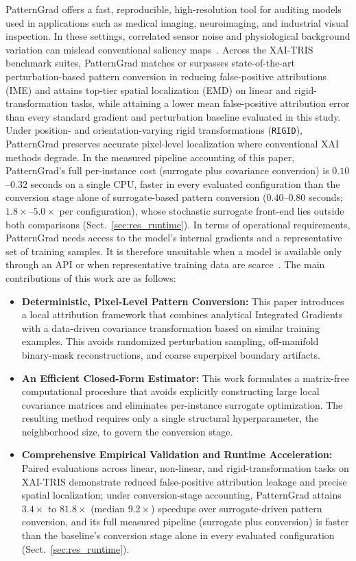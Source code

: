 \documentclass[pdflatex,sn-mathphys-num]{sn-jnl}
\theoremstyle{thmstyleone}
\theoremstyle{thmstyletwo}%
\theoremstyle{thmstylethree}%
\begin{document}
PatternGrad offers a fast, reproducible, high-resolution tool for auditing models used in applications such as medical imaging, neuroimaging, and industrial visual inspection. In these settings, correlated sensor noise and physiological background variation can mislead conventional saliency maps~\cite{haufe2014, clark2024, oliveira2024benchmarking}. Across the XAI-TRIS benchmark suites, PatternGrad matches or surpasses state-of-the-art perturbation-based pattern conversion in reducing false-positive attributions (IME) and attains top-tier spatial localization (EMD) on linear and rigid-transformation tasks, while attaining a lower mean false-positive attribution error than every standard gradient and perturbation baseline evaluated in this study. Under position- and orientation-varying rigid transformations (\texttt{RIGID}), PatternGrad preserves accurate pixel-level localization where conventional XAI methods degrade. In the measured pipeline accounting of this paper, PatternGrad's full per-instance cost (surrogate plus covariance conversion) is $0.10$--$0.32$ seconds on a single CPU, faster in every evaluated configuration than the conversion stage alone of surrogate-based pattern conversion ($0.40$--$0.80$ seconds; $1.8\times$--$5.0\times$ per configuration), whose stochastic surrogate front-end lies outside both comparisons (Sect.~\ref{sec:res_runtime}). In terms of operational requirements, PatternGrad needs access to the model's internal gradients and a representative set of training samples. It is therefore unsuitable when a model is available only through an API or when representative training data are scarce~\cite{gjoelbye2025}. The main contributions of this work are as follows:

\begin{itemize}
    \item \textbf{Deterministic, Pixel-Level Pattern Conversion:} This paper introduces a local attribution framework that combines analytical Integrated Gradients with a data-driven covariance transformation based on similar training examples. This avoids randomized perturbation sampling, off-manifold binary-mask reconstructions, and coarse superpixel boundary artifacts.
    \item \textbf{An Efficient Closed-Form Estimator:} This work formulates a matrix-free computational procedure that avoids explicitly constructing large local covariance matrices and eliminates per-instance surrogate optimization. The resulting method requires only a single structural hyperparameter, the neighborhood size, to govern the conversion stage.
    \item \textbf{Comprehensive Empirical Validation and Runtime Acceleration:} Paired evaluations across linear, non-linear, and rigid-transformation tasks on XAI-TRIS demonstrate reduced false-positive attribution leakage and precise spatial localization; under conversion-stage accounting, PatternGrad attains $3.4\times$ to $81.8\times$ (median $9.2\times$) speedups over surrogate-driven pattern conversion, and its full measured pipeline (surrogate plus conversion) is faster than the baseline's conversion stage alone in every evaluated configuration (Sect.~\ref{sec:res_runtime}).
\end{itemize}
\end{document}
